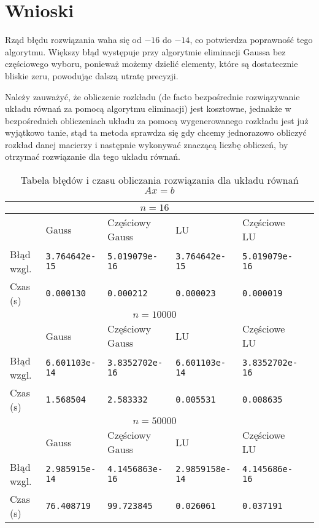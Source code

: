 \documentclass[../main.tex]{subfiles}
\begin{document}
  \section{Wnioski}

  Rząd błędu rozwiązania waha się od \( -16 \) do \( -14 \), co potwierdza poprawność tego
  algorytmu. Większy błąd występuje przy algorytmie eliminacji Gaussa bez częściowego wyboru,
  ponieważ możemy dzielić elementy, które są dostatecznie bliskie zeru, powodując dalszą
  utratę precyzji.

  Należy zauważyć, że obliczenie rozkładu (de facto bezpośrednie rozwiązywanie układu równań
  za pomocą algorytmu eliminacji) jest kosztowne, jednakże w bezpośrednich obliczeniach
  układu za pomocą wygenerowanego rozkładu jest już wyjątkowo tanie, stąd ta metoda sprawdza się
  gdy chcemy jednorazowo obliczyć rozkład danej macierzy i następnie wykonywać znaczącą liczbę
  obliczeń, by otrzymać rozwiązanie dla tego układu równań.

  \begin{table}
    \label{tab:results}
    \centering
    \begin{tabular}{|l|l|l|l|l|l|}
      \hline 
      \multicolumn{5}{|c|}{$n = 16$} \\\hline 
      & Gauss & Częściowy Gauss & LU & Częściowe LU \\ \hline
      Błąd wzgl. & \texttt{3.764642e-15} & \texttt{5.019079e-16} &
      \texttt{3.764642e-15} &
      \texttt{5.019079e-16} \\ \hline
      Czas (s) & \texttt{0.000130} & \texttt{0.000212} & \texttt{0.000023} & \texttt{0.000019} \\ \hline
      \multicolumn{5}{|c|}{$n = 10000$} \\\hline 
      & Gauss & Częściowy Gauss & LU & Częściowe LU \\ \hline
      Błąd wzgl. & \texttt{6.601103e-14} & \texttt{3.8352702e-16} &
      \texttt{6.601103e-14} &
      \texttt{3.8352702e-16} \\ \hline
      Czas (s) & \texttt{1.568504} & \texttt{2.583332} & \texttt{0.005531} & \texttt{0.008635} \\ \hline
      \multicolumn{5}{|c|}{$n = 50000$} \\\hline 
      & Gauss & Częściowy Gauss & LU & Częściowe LU \\ \hline
      Błąd wzgl. & \texttt{2.985915e-14} & \texttt{4.1456863e-16} &
      \texttt{2.9859158e-14} &
      \texttt{4.145686e-16} \\ \hline
      Czas (s) & \texttt{76.408719} & \texttt{99.723845} & \texttt{0.026061} & \texttt{0.037191} \\ \hline
    \end{tabular}
    \caption{Tabela błędów i czasu obliczania rozwiązania dla układu równań \( Ax = b \)}
  \end{table}
\end{document}
